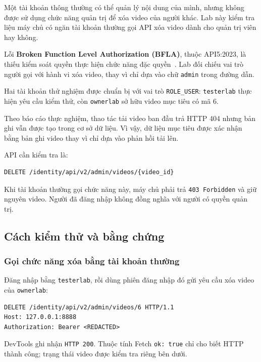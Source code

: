 \documentclass[oneside,a4paper,12pt]{extreport}
\begin{document}
Một tài khoản thông thường có thể quản lý nội dung của mình, nhưng
không được sử dụng chức năng quản trị để xóa video của người khác.
Lab này kiểm tra liệu máy chủ có ngăn tài khoản thường gọi API xóa
video dành cho quản trị viên hay không.

Lỗi \textbf{Broken Function Level Authorization (BFLA)}, thuộc
API5:2023, là thiếu kiểm soát quyền thực hiện chức năng đặc
quyền~\cite{owasp-bfla}. Lab đối chiếu vai trò người gọi với hành vi
xóa video, thay vì chỉ dựa vào chữ \texttt{admin} trong đường dẫn.

Hai tài khoản thử nghiệm được
chuẩn bị với vai trò \texttt{ROLE\_USER}: \texttt{testerlab} thực hiện
yêu cầu kiểm thử, còn \texttt{ownerlab} sở hữu video mục tiêu có mã 6.

Theo báo cáo thực nghiệm, thao tác tải video ban đầu trả HTTP 404 nhưng
bản ghi vẫn được tạo trong cơ sở dữ liệu. Vì vậy, dữ liệu mục tiêu được
xác nhận bằng bản ghi video thay vì chỉ dựa vào phản hồi tải lên.

API cần kiểm tra là:
\begin{Verbatim}[breaklines=true,breakanywhere=true,fontsize=\small]
DELETE /identity/api/v2/admin/videos/{video_id}
\end{Verbatim}

Khi tài khoản thường gọi chức năng này, máy chủ phải trả
\texttt{403 Forbidden} và giữ nguyên video. Người đã đăng nhập không
đồng nghĩa với người có quyền quản trị.

\subsection{Cách kiểm thử và bằng chứng}

\subsubsection{Gọi chức năng xóa bằng tài khoản thường}

Đăng nhập bằng \texttt{testerlab}, rồi dùng phiên đăng nhập đó gửi yêu
cầu xóa video của \texttt{ownerlab}:
\begin{Verbatim}[breaklines=true,breakanywhere=true,fontsize=\small]
DELETE /identity/api/v2/admin/videos/6 HTTP/1.1
Host: 127.0.0.1:8888
Authorization: Bearer <REDACTED>
\end{Verbatim}

DevTools ghi nhận \texttt{HTTP 200}. Thuộc tính Fetch
\texttt{ok: true} chỉ cho biết HTTP thành công; trạng thái video
được kiểm tra riêng bên dưới.
\end{document}

